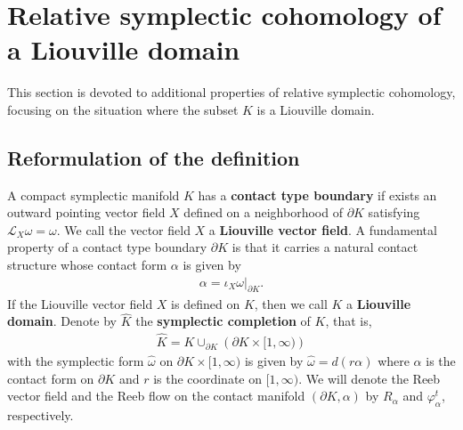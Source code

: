 \documentclass[12pt]{amsart}
\theoremstyle{definition}
\begin{document}
\section{Relative symplectic cohomology of a Liouville domain}
This section is devoted to additional properties of relative symplectic cohomology, focusing on the situation where the subset $K$ is a Liouville domain. 
\subsection{Reformulation of the definition}
A compact symplectic manifold $K$ has a \textbf{contact type boundary} if exists an outward pointing vector field $X$ defined on a neighborhood of $\partial K$ satisfying $\mathcal{L}_X \omega = \omega$.  We call the vector field $X$ a \textbf{Liouville vector field}. A fundamental property of a contact type boundary $\partial K$ is that it carries a natural contact structure whose contact form $\alpha$ is given by
\begin{align*}
    \alpha = \iota_X \omega|_{\partial K}.
\end{align*}
If the Liouville vector field $X$ is defined on $K$, then we call $K$ a \textbf{Liouville domain}. Denote by $\widehat{K}$ the \textbf{symplectic completion} of $K$, that is,
\begin{align*}
    \widehat{K} = K \cup_{\partial K} \left( \partial K \times [1, \infty) \right)
\end{align*}
with the symplectic form $\widehat{\omega}$ on $\partial K \times [1,\infty)$ is given by $\widehat{\omega} = d(r \alpha)$ where $\alpha $ is the contact form on $\partial K$ and $r$ is the coordinate on $[1,\infty)$. We will denote the Reeb vector field and the Reeb flow on the contact manifold $(\partial K, \alpha)$ by $R_\alpha$ and $\varphi_\alpha^t$, respectively.

\vspace{0.2 cm}
\end{document}
